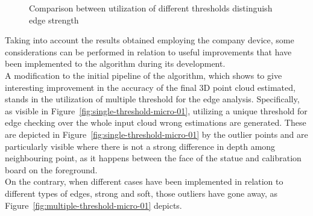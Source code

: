 \begin{figure}[t]
	\centering
\caption{Comparison between utilization of different thresholds distinguish edge strength}
\label{fig:threshold-soft-strong-edges-micro-01}
\end{figure}

Taking into account the results obtained employing the company device, some considerations can be performed in relation to useful improvements that have been implemented to the algorithm during its development. \\
A modification to the initial pipeline of the algorithm, which shows to give interesting improvement in the accuracy of the final 3D point cloud estimated, stands in the utilization of multiple threshold for the edge analysis.
Specifically, as visible in Figure~\ref{fig:single-threshold-micro-01}, utilizing a unique threshold for edge checking over the whole input cloud wrong estimations are generated.
These are depicted in Figure~\ref{fig:single-threshold-micro-01} by the outlier points and are particularly visible where there is not a strong difference in depth among neighbouring point, as it happens between the face of the statue and calibration board on the foreground.\\
On the contrary, when different cases have been implemented in relation to different types of edges, strong and soft, those outliers have gone away, as Figure~\ref{fig:multiple-threshold-micro-01} depicts.


